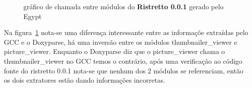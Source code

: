 \begin{figure}
\center
{}
\qquad
{}
\caption{gráfico de chamada entre módulos do {\bf Ristretto 0.0.1} gerado pelo Egypt}
\label{ristretto-0.0.1}
\end{figure}

Na figura~\ref{ristretto-0.0.1} nota-se uma diferença interessante entre as
informaçõe extraídas pelo GCC e o Doxyparse, há uma inversão entre os módulos
thumbnailer\_viewer e picture\_viewer. Enquanto o Doxyparse diz que o
picture\_viewer chama o thumbnailer\_viewer no GCC temos o contrário, após uma
verificação ao código fonte do ristretto 0.0.1 nota-se que nenhum dos 2 módulos
se referenciam, então os dois extratores estão dando informações incorretas.

